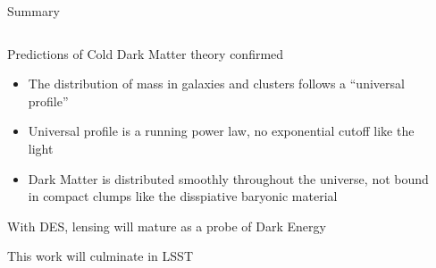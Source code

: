 \documentclass{beamer}
\begin{document}
\frame
{

    {\Huge Summary}

    \begin{columns}
        \begin{column}{0.65\textwidth}
            \begin{itemize}
                    {\color{white}


                        \item Predictions of Cold Dark Matter theory confirmed
                            \begin{itemize} 

                                \item The distribution of mass in galaxies and
                                    clusters follows a ``universal profile''
                                    
                                \item Universal profile is a running power law, no
                                    exponential cutoff like the light

                                \item Dark Matter is distributed smoothly throughout
                                    the universe, not bound in compact clumps like the
                                    disspiative baryonic material
                            \end{itemize}

                        \item With DES, lensing will mature as a probe of Dark Energy

                        \item This work will culminate in LSST

                    }
            \end{itemize}
        \end{column}
        \begin{column}{0.35\textwidth}
        \end{column}
    \end{columns}
}
\end{document}

